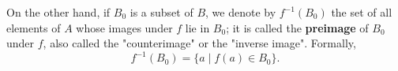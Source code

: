 \documentclass[a4paper]{report}
\begin{document}
\begin{itemize}
	On the other hand, if $B_{0}$ is a subset of $B$, we denote by $f^{-1}(B_{0})$ the set of all elements of $A$ whose images under $f$ lie in $B_{0}$; it is called the \textbf{preimage} of $B_{0}$ under $f$, also called the "counterimage" or the "inverse image". Formally, 
	\[
		f^{-1}(B_{0}) = \{a \mid f(a) \in B_{0}\}. 
	\]

	
\end{itemize}

	
\end{document}
